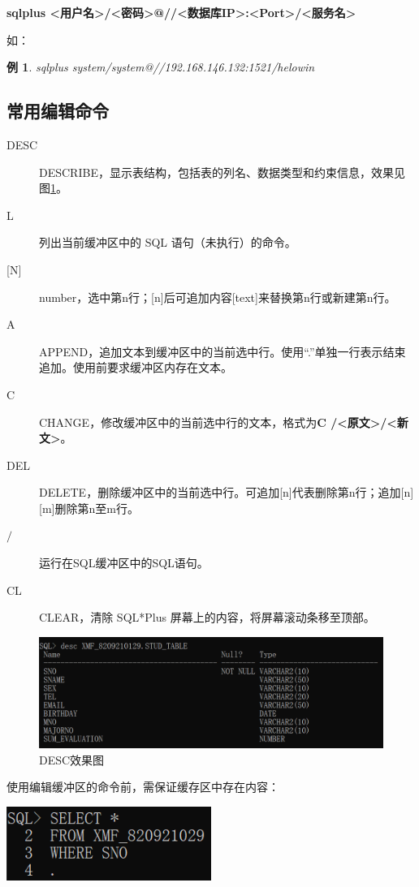\documentclass[11pt, a4paper, oneside, UTF8]{ctexbook}
\let\kaishu\relax %
\newtheorem{example}[theorem]{例}
\begin{document}
{\bfseries\kaishu sqlplus <用户名>/<密码>@//<数据库IP>:<Port>/<服务名>}

如：
\begin{example}
  sqlplus system/system@//192.168.146.132:1521/helowin
\end{example}

\subsection{常用编辑命令}
\begin{description}
  \item[DESC] DESCRIBE，显示表结构，包括表的列名、数据类型和约束信息，效果见图\ref{fig:DESC_SQLPLUS}。
  \item[L] 列出当前缓冲区中的 SQL 语句（未执行）的命令。
    \item[\textup{[N]}] number，选中第n行；[n]后可追加内容[text]来替换第n行或新建第n行。
  \item[A] APPEND，追加文本到缓冲区中的当前选中行。使用“.”单独一行表示结束追加。使用前要求缓冲区内存在文本。
  \item[C] CHANGE，修改缓冲区中的当前选中行的文本，格式为{\bfseries\kaishu C /<原文>/<新文>}。
  \item[DEL] DELETE，删除缓冲区中的当前选中行。可追加[n]代表删除第n行；追加[n][m]删除第n至m行。
  \item[$\boldsymbol{/}$] 运行在SQL缓冲区中的SQL语句。
  \item[CL] CLEAR，清除 SQL*Plus 屏幕上的内容，将屏幕滚动条移至顶部。
\end{description}
\begin{figure}[htbp]
  \center
  \includegraphics[width=\textwidth]{picture/DESC_SQLPLUS效果.png}
  \caption{DESC效果图}
  \label{fig:DESC_SQLPLUS}
\end{figure}

使用编辑缓冲区的命令前，需保证缓存区中存在内容：

\begin{center}
  \begin{minipage}{\textwidth}
    \center
    \includegraphics[width=0.5\textwidth]{picture/输入内容到缓冲区.png}
    \captionsetup{hypcap=false}
    \label{fig:输入内容到缓冲区}
  \end{minipage}
\end{center}
\end{document}
